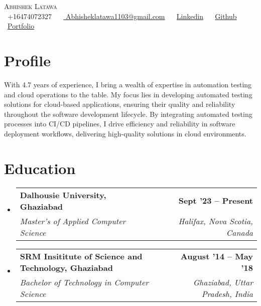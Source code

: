\documentclass[letterpaper,11pt]{article}
\makeatletter
\newcommand{\resumeSubheading}[4]{
  \vspace{-2pt}\item
    \begin{tabular*}{1.0\textwidth}[t]{l@{\extracolsep{\fill}}r}
      \textbf{#1} & \textbf{\small #2} \\
      \textit{\small#3} & \textit{\small #4} \\
    \end{tabular*}\vspace{-7pt}
}
\newcommand{\resumeSubHeadingListStart}{\begin{itemize}[leftmargin=0.0in, label={}]}
\newcommand{\resumeSubHeadingListEnd}{\end{itemize}}
\makeatother
\begin{document}

\begin{center}
    {\Huge \scshape Abhishek Latawa} \\ \vspace{1pt}
    \vspace{5pt}
    \small \raisebox{-0.1\height}\faPhone\ +16474072327 ~
    \raisebox{-0.2\height}\faEnvelope\ \href{mailto:yashbest005@gmail.com}{ Abhisheklatawa1103@gmail.com} ~
    \raisebox{-0.2\height}\faLinkedin\ \href{https://www.linkedin.com/in/abhishek-latawa-a3177b129/}{Linkedin} ~
    \raisebox{-0.2\height}\faGithub\ \href{https://github.com/abhilatawa}{Github} ~ \raisebox{-0.2\height}\faGlobe\ \href{https://read.cv/alatawa}{Portfolio}
    \vspace{-8pt}
\end{center}

\section{Profile}
{With 4.7 years of experience, I bring a wealth of expertise in automation testing and cloud operations to the table. My focus lies in developing automated testing solutions for cloud-based applications, ensuring their quality and reliability throughout the software development lifecycle. By integrating automated testing processes into CI/CD pipelines, I drive efficiency and reliability in software deployment workflows, delivering high-quality solutions in cloud environments.}


\section{Education}
  \resumeSubHeadingListStart
    \resumeSubheading
    {Dalhousie University, Ghaziabad}{Sept '23 -- Present}
      {Master's of Applied Computer Science }{Halifax, Nova Scotia, Canada}
      \resumeSubheading
      {SRM Insititute of Science and Technology, Ghaziabad}{August '14 -- May '18}
      {Bachelor of Technology in Computer Science}{Ghaziabad, Uttar Pradesh, India}
  \resumeSubHeadingListEnd
\end{document}
